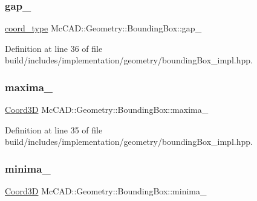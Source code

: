 \subsubsection{\texorpdfstring{gap\+\_\+}{gap\_}}
{\footnotesize\ttfamily \hyperlink{namespaceMcCAD_1_1Geometry_ac043b37a4a7e849fca22869e1982d2f8}{coord\+\_\+type} Mc\+C\+A\+D\+::\+Geometry\+::\+Bounding\+Box\+::gap\+\_\+\hspace{0.3cm}{\ttfamily [private]}}



Definition at line 36 of file build/includes/implementation/geometry/bounding\+Box\+\_\+impl.\+hpp.

\mbox{\label{classMcCAD_1_1Geometry_1_1BoundingBox_aa69d74a92caca3795ecd4089c3f71a87}} 
\subsubsection{\texorpdfstring{maxima\+\_\+}{maxima\_}}
{\footnotesize\ttfamily \hyperlink{classMcCAD_1_1Geometry_1_1Coord3D}{Coord3D} Mc\+C\+A\+D\+::\+Geometry\+::\+Bounding\+Box\+::maxima\+\_\+\hspace{0.3cm}{\ttfamily [private]}}



Definition at line 35 of file build/includes/implementation/geometry/bounding\+Box\+\_\+impl.\+hpp.

\mbox{\label{classMcCAD_1_1Geometry_1_1BoundingBox_a2fbfb7dc1c01528377da86ff313fc6e6}} 
\subsubsection{\texorpdfstring{minima\+\_\+}{minima\_}}
{\footnotesize\ttfamily \hyperlink{classMcCAD_1_1Geometry_1_1Coord3D}{Coord3D} Mc\+C\+A\+D\+::\+Geometry\+::\+Bounding\+Box\+::minima\+\_\+\hspace{0.3cm}{\ttfamily [private]}}



